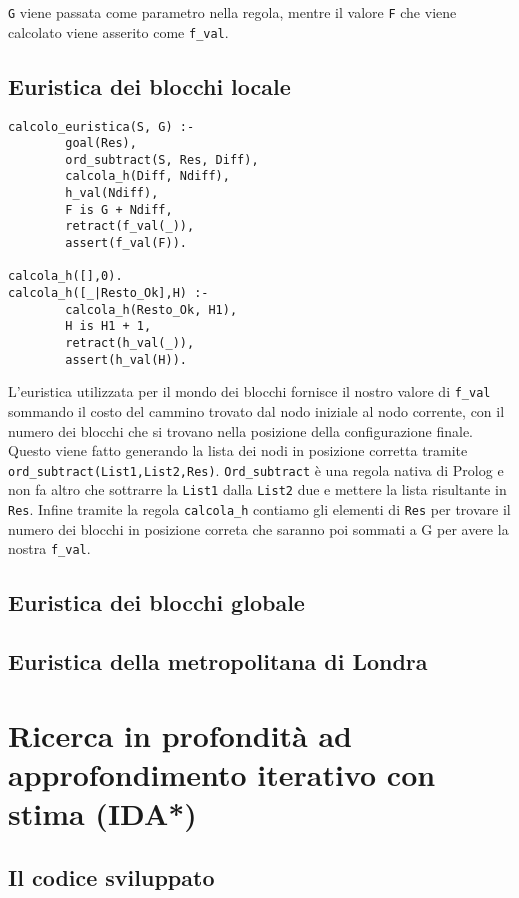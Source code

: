 \lstinline{G} viene passata come parametro nella regola, mentre il valore \lstinline{F} che viene calcolato viene asserito come \lstinline{f_val}.

\subsection{Euristica dei blocchi locale}
\begin{lstlisting}
calcolo_euristica(S, G) :-
        goal(Res),
        ord_subtract(S, Res, Diff),
        calcola_h(Diff, Ndiff),
        h_val(Ndiff),
        F is G + Ndiff,
        retract(f_val(_)),
        assert(f_val(F)).

calcola_h([],0).
calcola_h([_|Resto_Ok],H) :-
        calcola_h(Resto_Ok, H1),
        H is H1 + 1,
        retract(h_val(_)),
        assert(h_val(H)).
\end{lstlisting}

L'euristica utilizzata per il mondo dei blocchi fornisce il nostro valore di \lstinline{f_val} sommando il costo del cammino trovato dal nodo iniziale al nodo corrente, con il numero dei blocchi che si trovano nella posizione della configurazione finale. Questo viene fatto generando la lista dei nodi in posizione corretta tramite \lstinline{ord_subtract(List1,List2,Res)}. \lstinline{Ord_subtract} è una regola nativa di Prolog e non fa altro che sottrarre la \lstinline{List1} dalla \lstinline{List2} due e mettere la lista risultante in \lstinline{Res}. Infine tramite la regola \lstinline{calcola_h} contiamo gli elementi di \lstinline{Res} per trovare il numero dei blocchi in posizione correta che saranno poi sommati a G per avere la nostra \lstinline{f_val}.

\subsection{Euristica dei blocchi globale}
\subsection{Euristica della metropolitana di Londra}


\section{Ricerca in profondità ad approfondimento iterativo con stima (IDA*)}

\subsection{Il codice sviluppato}

